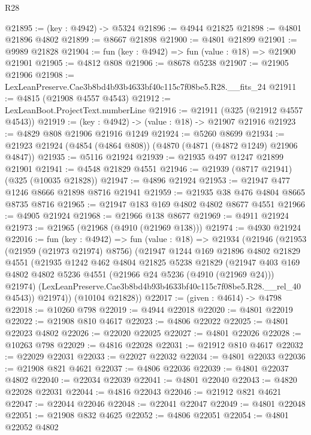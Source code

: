 \begin{lexlean}{R28}
\begin{coremodule}
@21895 := (key : @4942) -> @5324
@21896 := @4944 @21825
@21898 := @4801 @21896 @4802
@21899 := @8667 @21898
@21900 := @4801 @21899
@21901 := @9989 @21828
@21904 := fun (key : @4942) => fun (value : @18) => @21900 @21901
@21905 := @4812 @808
@21906 := @8678 @5238
@21907 := @21905 @21906
@21908 := LexLeanPreserve.Cae3b8bd4b93b4633bf40c115c7f08be5.R28.__fits_24
@21911 := @4815 (@21908 @4557 @4543)
@21912 := LexLeanBoot.ProjectText.numberLine
@21916 := @21911 (@325 (@21912 @4557 @4543))
@21919 := (key : @4942) -> (value : @18) -> @21907 @21916
@21923 := @4829 @808 @21906 @21916 @1249
@21924 := @5260 @8699
@21934 := @21923 @21924 (@4854 (@4864 @808)) (@4870 (@4871 (@4872 @1249) @21906 @4847))
@21935 := @5116 @21924
@21939 := @21935 @497 @1247 @21899 @21901
@21941 := @4548 @21829 @4551
@21946 := @21939 (@8717 @21941) (@325 (@10035 @21828))
@21947 := @4896 @21924
@21953 := @21947 @477 @1246 @8666 @21898 @8716 @21941
@21959 := @21935 @38 @476 @4804 @8665 @8735 @8716
@21965 := @21947 @183 @169 @4802 @4802 @8677 @4551
@21966 := @4905 @21924
@21968 := @21966 @138 @8677
@21969 := @4911 @21924
@21973 := @21965 (@21968 (@4910 (@21969 @138)))
@21974 := @4930 @21924
@22016 := fun (key : @4942) =>
  fun (value : @18) =>
  @21934
    (@21946
      (@21953
        (@21959 (@21973 @21974) @8756)
        (@21947
          @1244
          @169
          @21896
          @4802
          @21829
          @4551
          (@21935
            @1242
            @462
            @4804
            @21825
            @5238
            @21829
            (@21947
              @403
              @169
              @4802
              @4802
              @5236
              @4551
              (@21966 @24 @5236 (@4910 (@21969 @24)))
              @21974)
            (LexLeanPreserve.Cae3b8bd4b93b4633bf40c115c7f08be5.R28.__rel_40 @4543))
          @21974))
      (@10104 @21828))
@22017 := (given : @4614) -> @4798
@22018 := @10260 @798
@22019 := @4944 @22018
@22020 := @4801 @22019
@22022 := @21908 @810 @4617
@22023 := @4806 @22022
@22025 := @4801 @22023 @4802
@22026 := @22020 @22025
@22027 := @4801 @22026
@22028 := @10263 @798
@22029 := @4816 @22028
@22031 := @21912 @810 @4617
@22032 := @22029 @22031
@22033 := @22027 @22032
@22034 := @4801 @22033
@22036 := @21908 @821 @4621
@22037 := @4806 @22036
@22039 := @4801 @22037 @4802
@22040 := @22034 @22039
@22041 := @4801 @22040
@22043 := @4820 @22028 @22031
@22044 := @4816 @22043
@22046 := @21912 @821 @4621
@22047 := @22044 @22046
@22048 := @22041 @22047
@22049 := @4801 @22048
@22051 := @21908 @832 @4625
@22052 := @4806 @22051
@22054 := @4801 @22052 @4802

\end{coremodule}
\end{lexlean}
